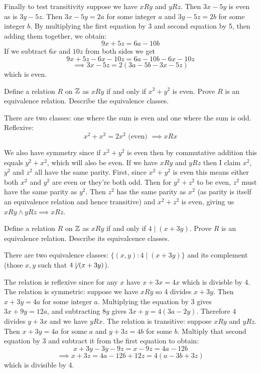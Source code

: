 \documentclass{article}
\begin{document}
Finally to test transitivity suppose we have $xRy$ and $yRz$. Then $3x - 5y$ is even as is $3y - 5z$. Then $3x - 5y = 2a$ for some integer $a$ and $3y - 5z = 2b$ for some integer $b$. By multiplying the first equation by 3 and second equation by 5, then adding them together, we obtain:
$$9x + 5z = 6a - 10b$$
If we subtract $6x$ and $10z$ from both sides we get
$$9x + 5z -6x - 10z = 6a - 10b - 6x - 10z$$
$$\implies 3x - 5z = 2(3a - 5b - 3x - 5z)$$
which is even.


\begin{problem}
Define a relation $R$ on $\mathbb{Z}$ as $xRy$ if and only if $x^2 + y^2$ is even. Prove $R$ is an equivalence relation. Describe the equivalence classes.
\end{problem}

There are two classes: one where the sum is even and one where the sum is odd. Reflexive:
$$x^2 + x^2 = 2x^2 \text{ (even) } \implies xRx$$

We also have symmetry since if $x^2 + y^2$ is even then by commutative addition this equals $y^2 + x^2$, which will also be even. If we have $xRy$ and $yRz$ then I claim $x^2$, $y^2$ and $z^2$ all have the same parity. First, since $x^2 + y^2$ is even this means either both $x^2$ and $y^2$ are even or they're both odd. Then for $y^2 + z^2$ to be even, $z^2$ must have the same parity as $y^2$. Then $z^2$ has the same parity as $x^2$ (as parity is itself an equivalence relation and hence transitive) and $x^2 + z^2$ is even, giving us $xRy \land yRz \implies xRz$.

\begin{problem}
Define a relation $R$ on $\mathbb{Z}$ as $xRy$ if and only if $4 \mid (x + 3y)$. Prove $R$ is an equivalence relation. Describe its equivalcence classes.
\end{problem}

There are two equivalence classes: $\{(x, y): 4 \mid (x + 3y) \}$ and its complement (those $x, y$ such that $4 \not\mid (x + 3y)$).

The relation is reflexive since for any $x$ have $x + 3x = 4x$ which is divisble by 4. The relation is symmetric: suppose we have $xRy$ so 4 divides $x + 3y$. Then $x + 3y = 4a$ for some integer $a$. Multiplying the equation by 3 gives $3x+ 9y = 12a$, and subtracting $8y$ gives $3x + y = 4(3a - 2y)$. Therefore 4 divides $y + 3x$ and we have $yRx$. The relation is transitive: suppose $xRy$ and $yRz$. Then $x + 3y = 4a$ for some $a$ and $y + 3z = 4b$ for some $b$. Multiply that second equation by 3 and subtract it from the first equation to obtain:
$$x + 3y - 3y - 9z = x - 9z = 4a - 12b$$
$$\implies x + 3z = 4a - 12b + 12z = 4(a - 3b + 3z)$$
which is divisible by 4.
\end{document}
